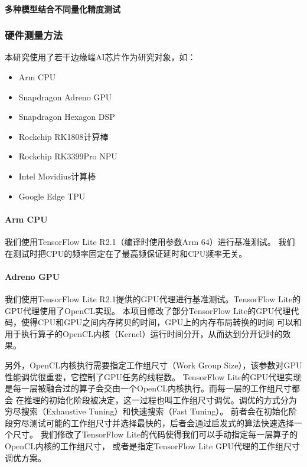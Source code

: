 \paragraph{多种模型结合不同量化精度测试}

\subsubsection{硬件测量方法}

本研究使用了若干边缘端AI芯片作为研究对象，如：
\begin{itemize}
    \item Arm CPU
    \item Snapdragon Adreno GPU
    \item Snapdragon Hexagon DSP
    \item Rockchip RK1808计算棒
    \item Rockchip RK3399Pro NPU
    \item Intel Movidius计算棒
    \item Google Edge TPU
\end{itemize}

\paragraph{Arm CPU}
我们使用TensorFlow Lite R2.1（编译时使用参数Arm 64）进行基准测试。
我们在测试时把CPU的频率固定在了最高频保证延时和CPU频率无关。

\paragraph{Adreno GPU}
我们使用TensorFlow Lite R2.1提供的GPU代理进行基准测试。TensorFlow Lite的GPU代理使用了OpenCL实现。
本项目修改了部分TensorFlow Lite的GPU代理代码，使得CPU和GPU之间内存拷贝的时间，GPU上的内存布局转换的时间
可以和用于执行算子的OpenCL内核（Kernel）运行时间分开，从而达到分开记时的效果。

另外，OpenCL内核执行需要指定工作组尺寸（Work Group Size），该参数对GPU性能调优很重要，它控制了GPU任务的线程数。
TensorFlow Lite的GPU代理实现是每一层被融合过的算子会交由一个OpenCL内核执行。而每一层的工作组尺寸都会
在推理的初始化阶段被决定，这一过程也叫工作组尺寸调优。调优的方式分为穷尽搜索（Exhaustive Tuning）和快速搜索（Fast Tuning）。
前者会在初始化阶段穷尽测试可能的工作组尺寸并选择最快的，后者会通过启发式的算法快速选择一个尺寸。
我们修改了TensorFlow Lite的代码使得我们可以手动指定每一层算子的OpenCL内核的工作组尺寸，
或者是指定TensorFlow Lite GPU代理的工作组尺寸调优方案。

